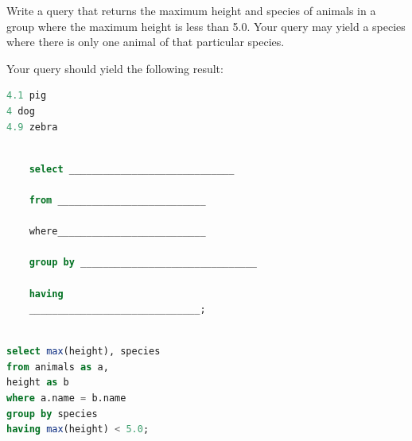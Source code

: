 \documentclass{exam}
\begin{document}
\begin{questions}
Write a query that returns the maximum height and species of animals in a group where the maximum height is less than 5.0.  Your query may yield a species where there is only one animal of that particular species.

Your query should yield the following result:
\begin{lstlisting}[language=SQL]
4.1 pig
4 dog
4.9 zebra
\end{lstlisting}

\begin{lstlisting}[language=SQL]

    select _____________________________ 

    from __________________________

    where__________________________

    group by _______________________________

    having 
    ______________________________;
\end{lstlisting}

\begin{solution}
\begin{lstlisting}[language=SQL]
 
select max(height), species
from animals as a, 
height as b
where a.name = b.name
group by species
having max(height) < 5.0;
\end{lstlisting}
\end{solution}

\end{questions}

\end{document}
